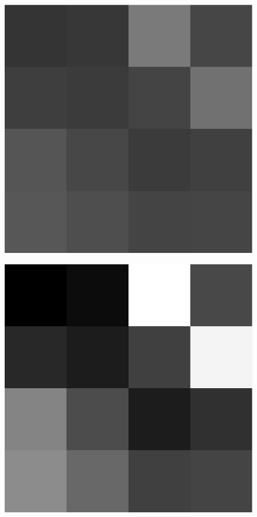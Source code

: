 \documentclass{article}
\begin{document}
\begin{figure}[ht]
\begin{minipage}[c]{.35\linewidth}
    \label{esempio1}
    \end{minipage}%
    \begin{minipage}[c]{.3\linewidth}
    \centering
        \includegraphics[scale=0.2]{immSorg.jpg}
    \label{esempio2}
    \end{minipage}
    \begin{minipage}[c]{.3\linewidth}
        \centering
            \includegraphics[scale=0.2]{immElab.jpg}
        \label{esempio3}
        \end{minipage}
    \end{figure}
\end{document}
